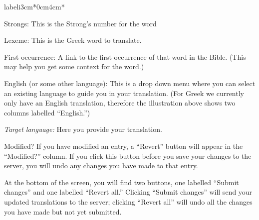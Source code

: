 \documentclass[11pt,oneside,a4paper]{memoir}
\begin{document}
\begin{flexlabelled}{labeli}{3cm}{*}{0cm}{4cm}{*}
\item[Strongs:] This is the Strong's number for the word
\item[Lexeme:] This is the Greek word to translate.
\item[First occurrence:\hfill] A link to the first occurrence of that word in the Bible. (This may
  help you get some context for the word.)
\item[English (or some other language):] This is a drop down menu where you can select an existing
  language to guide you in your translation. (For Greek we currently only have an English translation,
  therefore the illustration above shows two columns labelled ``English.'')
\item[\emph{Target language:}\hfill]  Here you provide your translation.
\item[Modified?] If you have modified an entry, a ``Revert'' button will appear in the ``Modified?''
  column. If you click this button before you save your changes to the server, you will undo any
  changes you have made to that entry.
\end{flexlabelled}

At the bottom of the screen, you will find two buttons, one labelled ``Submit changes'' and one
labelled ``Revert all.'' Clicking ``Submit changes'' will send your updated translations to the server;
clicking ``Revert all'' will undo all the changes you have made but not yet submitted.
\end{document}
